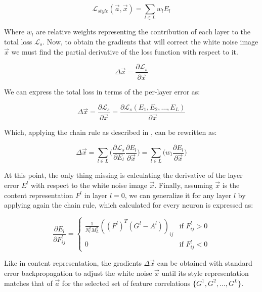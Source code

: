 \begin{equation}
  \mathcal{L}_{style}(\vec{a}, \vec{x}) =
  \sum_{l \in L} w_l E_l
\end{equation}

Where $w_l$ are relative weights representing the contribution of each layer to the total loss $\mathcal{L}_{s}$.
Now, to obtain the gradients that will correct the white noise image $\vec{x}$ we must find the partial derivative of the loss function with respect to it.

\begin{equation}
  \Delta \vec{x} =
  \frac{\partial \mathcal{L}_{s}}{\partial \vec{x}}
\end{equation}

We can express the total loss in terms of the per-layer error as:

\begin{equation}
  \Delta \vec{x} =
  \frac{\partial \mathcal{L}_{s}}{\partial \vec{x}} =
  \frac{\partial \mathcal{L}_{s}(E_1, E_2, \dots, E_L)}{\partial \vec{x}}
\end{equation}

Which, applying the chain rule as described in \cite[Eq. 3.23]{Hairer2008}, can be rewritten as:

\begin{equation}
  \Delta \vec{x} =
  \sum_{l \in L} \Bigg(\frac{\partial \mathcal{L}_s}{\partial E_l} \frac{\partial E_l}{\partial \vec{x}}\Bigg) =
  \sum_{l \in L} \Bigg(w_l \frac{\partial E_l}{\partial \vec{x}}\Bigg)
\end{equation}

At this point, the only thing missing is calculating the derivative of the layer error $E^l$ with respect to the white noise image $\vec{x}$.
Finally, assuming $\vec{x}$ is the content representation $F^l$ in layer $l = 0$, we can generalize it for any layer $l$ by applying again the chain rule, which calculated for every neuron is expressed as:

\begin{equation}
  \frac{\partial E_l}{\partial F^l_{ij}} =
  \begin{cases}
    \frac{1}{N^2_l M^2_L} ((F^l)^T (G^l - A^l))_{ij} & \text{if } F^l_{ij} > 0 \\
    0                                                & \text{if } F^l_{ij} < 0
  \end{cases}
\end{equation}

Like in content representation, the gradients $\Delta \vec{x}$ can be obtained with standard error backpropagation to adjust the white noise $\vec{x}$ until its style representation matches that of $\vec{a}$ for the selected set of feature correlations $\{G^1, G^2, \dots, G^L\}$.

